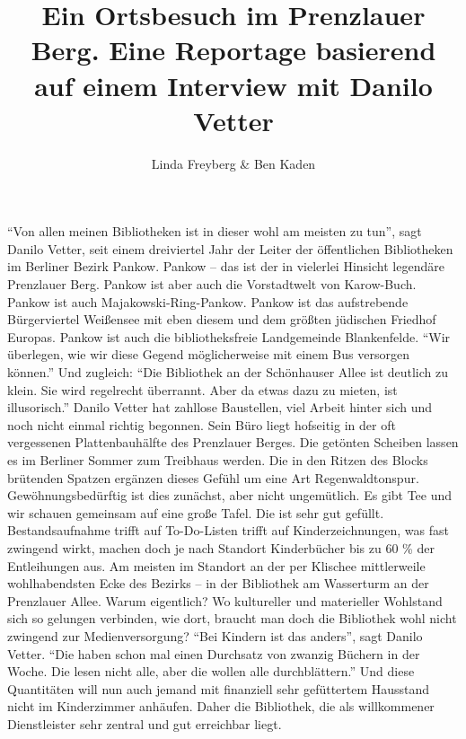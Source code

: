 \documentclass[a4paper,
fontsize=11pt,
oneside,
numbers=noperiodatend,
parskip=half-,
bibliography=totoc,
final
]{scrartcl}
\title{\LARGE{Ein Ortsbesuch im Prenzlauer Berg. Eine Reportage basierend auf einem Interview mit Danilo Vetter}} %
\author{Linda Freyberg \& Ben Kaden} %
\date{}
\begin{document}
\maketitle
\thispagestyle{fancyplain} 


\enquote{Von allen meinen Bibliotheken ist in dieser wohl am meisten zu
tun}, sagt Danilo Vetter, seit einem dreiviertel Jahr der Leiter der
öffentlichen Bibliotheken im Berliner Bezirk Pankow. Pankow -- das ist
der in vielerlei Hinsicht legendäre Prenzlauer Berg. Pankow ist aber
auch die Vorstadtwelt von Karow-Buch. Pankow ist auch
Majakowski-Ring-Pankow. Pankow ist das aufstrebende Bürgerviertel
Weißensee mit eben diesem und dem größten jüdischen Friedhof Europas.
Pankow ist auch die bibliotheksfreie Landgemeinde Blankenfelde.
\enquote{Wir überlegen, wie wir diese Gegend möglicherweise mit einem
Bus versorgen können.} Und zugleich: \enquote{Die Bibliothek an der
Schönhauser Allee ist deutlich zu klein. Sie wird regelrecht überrannt.
Aber da etwas dazu zu mieten, ist illusorisch.} Danilo Vetter hat
zahllose Baustellen, viel Arbeit hinter sich und noch nicht einmal
richtig begonnen. Sein Büro liegt hofseitig in der oft vergessenen
Plattenbauhälfte des Prenzlauer Berges. Die getönten Scheiben lassen es
im Berliner Sommer zum Treibhaus werden. Die in den Ritzen des Blocks
brütenden Spatzen ergänzen dieses Gefühl um eine Art Regenwaldtonspur.
Gewöhnungsbedürftig ist dies zunächst, aber nicht ungemütlich. Es gibt
Tee und wir schauen gemeinsam auf eine große Tafel. Die ist sehr gut
gefüllt. Bestandsaufnahme trifft auf To-Do-Listen trifft auf
Kinderzeichnungen, was fast zwingend wirkt, machen doch je nach Standort
Kinderbücher bis zu 60 \% der Entleihungen aus. Am meisten im Standort
an der per Klischee mittlerweile wohlhabendsten Ecke des Bezirks -- in
der Bibliothek am Wasserturm an der Prenzlauer Allee. Warum eigentlich?
Wo kultureller und materieller Wohlstand sich so gelungen verbinden, wie
dort, braucht man doch die Bibliothek wohl nicht zwingend zur
Medienversorgung? \enquote{Bei Kindern ist das anders}, sagt Danilo
Vetter. \enquote{Die haben schon mal einen Durchsatz von zwanzig Büchern
in der Woche. Die lesen nicht alle, aber die wollen alle durchblättern.}
Und diese Quantitäten will nun auch jemand mit finanziell sehr
gefüttertem Hausstand nicht im Kinderzimmer anhäufen. Daher die
Bibliothek, die als willkommener Dienstleister sehr zentral und gut
erreichbar liegt.
\end{document}
